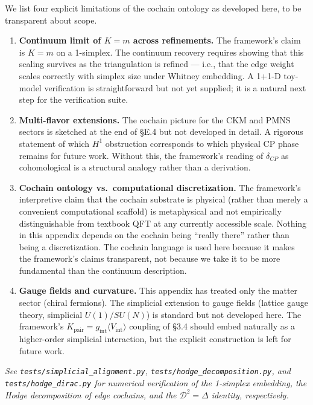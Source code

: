 \documentclass[
]{article}
\begin{document}
We list four explicit limitations of the cochain ontology as developed
here, to be transparent about scope.

\begin{enumerate}
\def\labelenumi{\arabic{enumi}.}
\item
  \textbf{Continuum limit of \(K = m\) across refinements.} The
  framework's claim is \(K = m\) on a 1-simplex. The continuum recovery
  requires showing that this scaling survives as the triangulation is
  refined --- i.e., that the edge weight scales correctly with simplex
  size under Whitney embedding. A 1+1-D toy-model verification is
  straightforward but not yet supplied; it is a natural next step for
  the verification suite.
\item
  \textbf{Multi-flavor extensions.} The cochain picture for the CKM and
  PMNS sectors is sketched at the end of §E.4 but not developed in
  detail. A rigorous statement of which \(H^1\) obstruction corresponds
  to which physical CP phase remains for future work. Without this, the
  framework's reading of \(\delta_{CP}\) as cohomological is a
  structural analogy rather than a derivation.
\item
  \textbf{Cochain ontology vs.~computational discretization.} The
  framework's interpretive claim that the cochain substrate is physical
  (rather than merely a convenient computational scaffold) is
  metaphysical and not empirically distinguishable from textbook QFT at
  any currently accessible scale. Nothing in this appendix depends on
  the cochain being ``really there'' rather than being a discretization.
  The cochain language is used here because it makes the framework's
  claims transparent, not because we take it to be more fundamental than
  the continuum description.
\item
  \textbf{Gauge fields and curvature.} This appendix has treated only
  the matter sector (chiral fermions). The simplicial extension to gauge
  fields (lattice gauge theory, simplicial \(U(1)/SU(N)\)) is standard
  but not developed here. The framework's
  \(K_{\text{pair}} = g_{\text{int}}\langle
  V_{\text{int}}\rangle\) coupling of §3.4 should embed naturally as a
  higher-order simplicial interaction, but the explicit construction is
  left for future work.
\end{enumerate}

\emph{See \texttt{tests/simplicial\_alignment.py},
\texttt{tests/hodge\_decomposition.py}, and
\texttt{tests/hodge\_dirac.py} for numerical verification of the
1-simplex embedding, the Hodge decomposition of edge cochains, and the
\(\mathcal{D}^2 = \Delta\) identity, respectively.}
\end{document}
